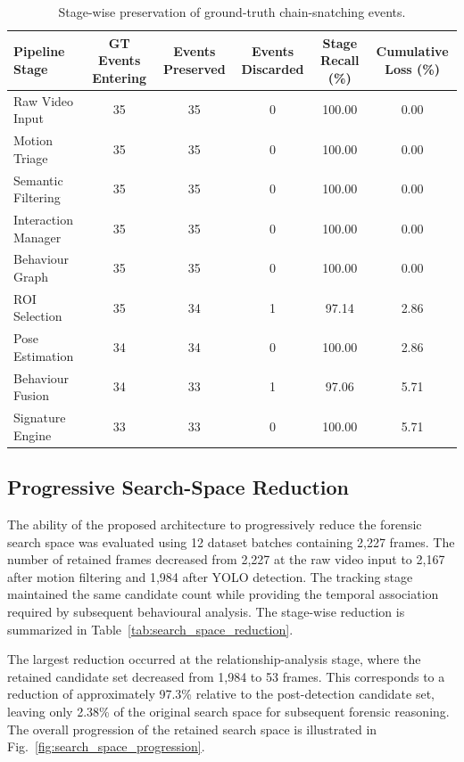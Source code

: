 \documentclass[conference]{IEEEtran}
\begin{document}
\begin{table}[t]
\centering
\caption{Stage-wise preservation of ground-truth chain-snatching events.}
\label{tab:evidence_preservation}
\begin{tabular}{lccccc}
\hline
\textbf{Pipeline Stage} &
\textbf{GT Events Entering} &
\textbf{Events Preserved} &
\textbf{Events Discarded} &
\textbf{Stage Recall (\%)} &
\textbf{Cumulative Loss (\%)} \\
\hline
Raw Video Input & 35 & 35 & 0 & 100.00 & 0.00 \\
Motion Triage & 35 & 35 & 0 & 100.00 & 0.00 \\
Semantic Filtering & 35 & 35 & 0 & 100.00 & 0.00 \\
Interaction Manager & 35 & 35 & 0 & 100.00 & 0.00 \\
Behaviour Graph & 35 & 35 & 0 & 100.00 & 0.00 \\
ROI Selection & 35 & 34 & 1 & 97.14 & 2.86 \\
Pose Estimation & 34 & 34 & 0 & 100.00 & 2.86 \\
Behaviour Fusion & 34 & 33 & 1 & 97.06 & 5.71 \\
Signature Engine & 33 & 33 & 0 & 100.00 & 5.71 \\
\hline
\end{tabular}
\end{table}

\subsection{Progressive Search-Space Reduction}

The ability of the proposed architecture to progressively reduce the
forensic search space was evaluated using 12 dataset batches containing
2,227 frames. The number of retained frames decreased from 2,227 at the
raw video input to 2,167 after motion filtering and 1,984 after YOLO
detection. The tracking stage maintained the same candidate count while
providing the temporal association required by subsequent behavioural
analysis. The stage-wise reduction is summarized in
Table~\ref{tab:search_space_reduction}.

The largest reduction occurred at the relationship-analysis stage,
where the retained candidate set decreased from 1,984 to 53 frames.
This corresponds to a reduction of approximately 97.3\% relative to the
post-detection candidate set, leaving only 2.38\% of the original
search space for subsequent forensic reasoning. The overall progression
of the retained search space is illustrated in
Fig.~\ref{fig:search_space_progression}.
\end{document}
